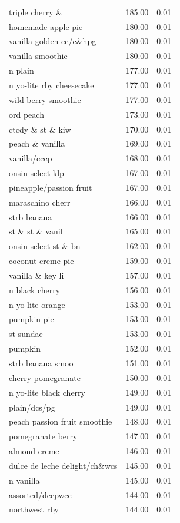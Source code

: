 \begin{table}
\begin{tabular}{lrr}
triple cherry \& & 185.00 & 0.01 \\
homemade apple pie & 180.00 & 0.01 \\
vanilla golden cc/c\&hpg & 180.00 & 0.01 \\
vanilla smoothie & 180.00 & 0.01 \\
n plain & 177.00 & 0.01 \\
n yo-lite rby cheesecake & 177.00 & 0.01 \\
wild berry smoothie & 177.00 & 0.01 \\
ord peach & 173.00 & 0.01 \\
ctcdy \& st \& kiw & 170.00 & 0.01 \\
peach \& vanilla & 169.00 & 0.01 \\
vanilla/cccp & 168.00 & 0.01 \\
onsin select klp & 167.00 & 0.01 \\
pineapple/passion fruit & 167.00 & 0.01 \\
maraschino cherr & 166.00 & 0.01 \\
strb banana & 166.00 & 0.01 \\
st \& st \& vanill & 165.00 & 0.01 \\
onsin select st \& bn & 162.00 & 0.01 \\
coconut creme pie & 159.00 & 0.01 \\
vanilla \& key li & 157.00 & 0.01 \\
n black cherry & 156.00 & 0.01 \\
n yo-lite orange & 153.00 & 0.01 \\
pumpkin pie & 153.00 & 0.01 \\
st sundae & 153.00 & 0.01 \\
pumpkin & 152.00 & 0.01 \\
strb banana smoo & 151.00 & 0.01 \\
cherry pomegranate & 150.00 & 0.01 \\
n yo-lite black cherry & 149.00 & 0.01 \\
plain/dcs/pg & 149.00 & 0.01 \\
peach passion fruit smoothie & 148.00 & 0.01 \\
pomegranate berry & 147.00 & 0.01 \\
almond creme & 146.00 & 0.01 \\
dulce de leche delight/ch\&wcs & 145.00 & 0.01 \\
n vanilla & 145.00 & 0.01 \\
assorted/dccpwcc & 144.00 & 0.01 \\
northwest rby & 144.00 & 0.01 \\

\end{tabular}
\end{table}

